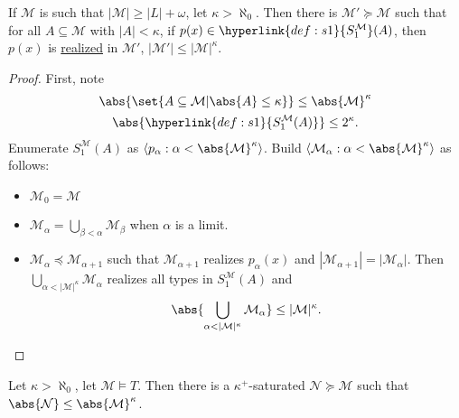 \documentclass{article}
\let\models\vDash
\newcommand{\M}{\mathcal{M}}
\renewcommand{\N}{\mathcal{N}}
\begin{document}
\begin{lemma}
  If $\M$ is such that $|\M| \geq |L| + \omega$, let $\kappa > \aleph_0$.
  Then there is $\M' \succcurlyeq \M$ such that for all $A \subseteq \M$ with $|A|< \kappa$, if $p(x) \in \hyperlink{def:s1}{S^\M_1}(A)$, then $p(x)$ is \hyperlink{def:type}{realized} in $\M'$, $|\M'| \leq |\M|^\kappa$.
\end{lemma}
\begin{proof}
  First, note
  \begin{gather*}
    \abs{\set{A \subseteq \M | \abs{A} \leq \kappa}} \leq \abs{\M}^\kappa \\
    \abs{\hyperlink{def:s1}{S_1^\M(A)}} \leq 2^\kappa.
  \end{gather*}
  Enumerate $S_1^\M(A)$ as $\langle p_\alpha : \alpha < \abs{\M}^\kappa \rangle$.
  Build $\langle \M_\alpha : \alpha < \abs{\M}^\kappa \rangle$ as follows:
  \begin{itemize}
    \item $\M_0 = \M$
    \item $\M_\alpha = \bigcup_{\beta < \alpha} \M_\beta$ when $\alpha$ is a limit.
  \item $\M_\alpha \preccurlyeq \M_{\alpha + 1}$ such that $\M_{\alpha+1}$ realizes $p_\alpha(x)$ and $|\M_{\alpha+1}| = |\M_\alpha|$.
    Then $\bigcup_{\alpha < |\M|^\kappa} \M_\alpha$ realizes all types in $S_1^\M(A)$ and
    \begin{equation*}
    \abs{\bigcup_{\alpha < |\M|^\kappa} \M_\alpha} \leq |\M|^\kappa. \qedhere
    \end{equation*}
  \end{itemize}
\end{proof}
\begin{thm}
  Let $\kappa > \aleph_0$, let $\M \models T$. Then there is a $\kappa^+$-saturated $\mathcal{N} \succcurlyeq \M$ such that $\abs{\N} \leq \abs{\M}^\kappa$.
\end{thm}
\end{document}
